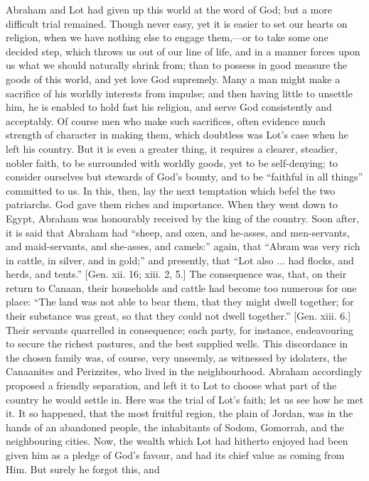 Abraham and Lot had given up this world at the word of God; but a
more difficult trial remained. Though never easy, yet it is easier to
set our hearts on religion, when we have nothing else to engage them,—or
to take some one decided step, which throws us out of our line of
life, and in a manner forces upon us what we should naturally shrink
from; than to possess in good measure the goods of this world, and yet
love God supremely. Many a man might make a sacrifice of his worldly
interests from impulse; and then having little to unsettle him, he is
enabled to hold fast his religion, and serve God consistently and
acceptably. Of course men who make such sacrifices, often evidence
much strength of character in making them, which doubtless was Lot's
case when he left his country. But it is even a greater thing, it
requires a clearer, steadier, nobler faith, to be surrounded with
worldly goods, yet to be self-denying; to consider ourselves but
stewards of God's bounty, and to be ``faithful in all things''
committed to us. In this, then, lay the next temptation which befel the
two patriarchs. God gave them riches and importance. When they went
down to Egypt, Abraham was honourably received by the king of the
country. Soon after, it is said that Abraham had ``sheep, and
oxen, and he-asses, and men-servants, and maid-servants, and
she-asses, and camels:'' again, that ``Abram was very rich in
cattle, in silver, and in gold;'' and presently, that ``Lot
also ... had flocks, and herds, and tents.'' [Gen. xii. 16; xiii.
2, 5.] The consequence was, that, on their return to Canaan, their
households and cattle had become too numerous for one place: ``The
land was not able to bear them, that they might dwell together; for
their substance was great, so that they could not dwell
together.'' [Gen. xiii. 6.] Their servants quarrelled in
consequence; each party, for instance, endeavouring to secure the
richest pastures, and the best supplied wells. This discordance in the
chosen family was, of course, very unseemly, as witnessed by
idolaters, the Canaanites and Perizzites, who lived in the
neighbourhood. Abraham accordingly proposed a friendly separation, and
left it to Lot to choose what part of the country he would settle in.
Here was the trial of Lot's faith; let us see how he met it. It so
happened, that the most fruitful region, the plain of Jordan, was in
the hands of an abandoned people, the inhabitants of Sodom, Gomorrah,
and the neighbouring cities. Now, the wealth which Lot had hitherto
enjoyed had been given him as a pledge of God's favour, and had its
chief value as coming from Him. But surely he forgot this, and
